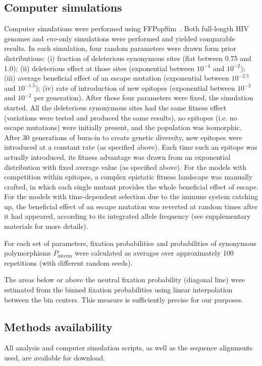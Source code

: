 \documentclass[rmp, twocolumn]{revtex4}
\newcommand{\env}{\textit{env}}
\begin{document}
\subsection{Computer simulations}
Computer simulations were performed using
FFPopSim~\citep{zanini_ffpopsim:_2012}. Both full-length HIV genomes and
\env{}-only simulations were performed and yielded comparable results. In each
simulation, four random parameters were drawn form prior distributions: (i)
fraction of deleterious synonymous sites (flat between 0.75 and 1.0); (ii)
deleterious effect at those sites (exponential between $10^{-4}$ and $10^{-2}$);
(iii) average beneficial effect of an escape mutation (exponential between
$10^{-2.5}$ and $10^{-1.5}$); (iv) rate of introduction of new epitopes
(exponential between $10^{-3}$ and $10^{-2}$ per generation). After these four
parameters were fixed, the simulation started. All the deleterious synonymous
sites had the same fitness effect (variations were tested and produced the same
results), no epitopes (i.e. no escape mutations) were initially present, and the
population was isomorphic.
After 30 generations of burn-in to create genetic diversity, new epitopes
were introduced at a constant rate (as specified above). Each time such an
epitope was actually introduced, its fitness advantage was drawn from an
exponential distribution with fixed average value (as specified above).
For the models with competition within epitopes, a complex epistatic fitness
landscape was manually crafted, in which each single mutant provides the whole
beneficial effect of escape. For the models with time-dependent selection due to
the immune system catching up, the beneficial effect of an escape mutation was
reverted at random times after it had appeared, according to its integrated allele
frequency (see supplementary materials for more details).

For each set of parameters, fixation probabilities and probabilities of
synonymous polymorphisms $P_\text{interm}$ were calculated as averages over
approximately 100 repetitions (with different random seeds).

The areas below or above the neutral fixation probability (diagonal line)
were estimated from the binned fixation probabilities using linear
interpolation between the bin centers. This measure is sufficiently precise for
our purposes.

\subsection{Methods availability}
All analysis and computer simulation scripts, as well as the sequence alignments
used, are available for download.
\end{document}
